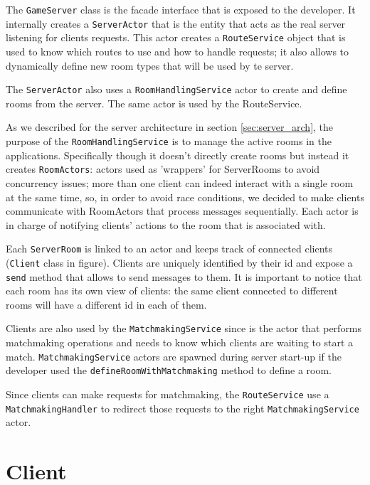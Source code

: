 The \texttt{GameServer} class is the facade interface that is exposed to the developer. It internally creates a \texttt{ServerActor} that is the entity that acts as the real server listening for clients requests. This actor creates a \texttt{RouteService} object that is used to know which routes to use and how to handle requests; it also allows to dynamically define new room types that will be used by te server. 

The \texttt{ServerActor} also uses a \texttt{RoomHandlingService} actor to create and define rooms from the server. The same actor is used by the RouteService.

As we described for the server architecture in section \ref{sec:server_arch}, the purpose of the \texttt{RoomHandlingService} is to manage the active rooms in the applications. Specifically though it doesn't directly create rooms but instead it creates \texttt{RoomActors}: actors used as 'wrappers' for ServerRooms to avoid concurrency issues; more than one client can indeed interact with a single room at the same time, so, in order to avoid race conditions, we decided to make clients communicate with RoomActors that process messages sequentially. Each actor is in charge of notifying clients' actions to the room that is associated with.

Each \texttt{ServerRoom} is linked to an actor and keeps track of connected clients (\texttt{Client} class in figure). Clients are uniquely identified by their id and expose a \texttt{send} method that allows to send messages to them. It is important to notice that each room has its own view of clients: the same client connected to different rooms will have a different id in each of them. 

Clients are also used by the \texttt{MatchmakingService} since is the actor that performs matchmaking operations and needs to know which clients are waiting to start a match. \texttt{MatchmakingService} actors are spawned during server start-up if the developer used the \texttt{defineRoomWithMatchmaking} method to define a room.

Since clients can make requests for matchmaking, the \texttt{RouteService} use a \texttt{MatchmakingHandler} to redirect those requests to the right \texttt{MatchmakingService} actor.


\section{Client}

